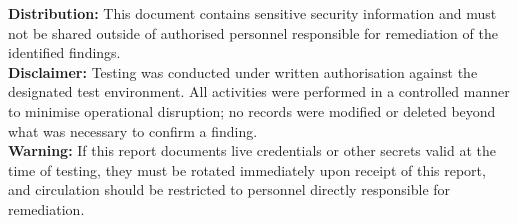 \begin{titlepage}
\vfill

\hspace{2.5cm}\begin{minipage}{13cm}
  \color{TextMain}
  \small
  \textbf{Distribution:} This document contains sensitive security information and must not be shared outside of authorised personnel responsible for remediation of the identified findings.\\[6pt]
  \textbf{Disclaimer:} Testing was conducted under written authorisation against the designated test environment. All activities were performed in a controlled manner to minimise operational disruption; no records were modified or deleted beyond what was necessary to confirm a finding.\\[6pt]
  \textbf{Warning:} If this report documents live credentials or other secrets valid at the time of testing, they must be rotated immediately upon receipt of this report, and circulation should be restricted to personnel directly responsible for remediation.
\end{minipage}
\vspace{1.0cm}
\end{titlepage}
